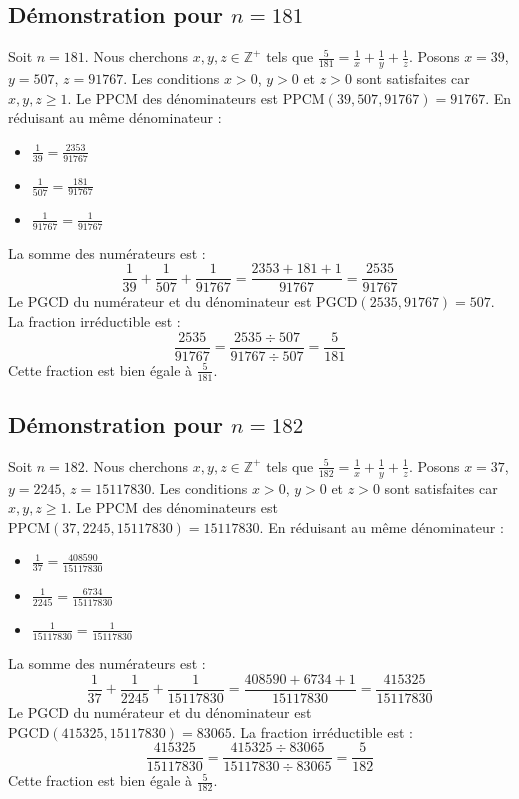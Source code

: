 \documentclass[11pt,a4paper]{article}
\begin{document}
\subsection{Démonstration pour $n = 181$}
Soit $n = 181$. Nous cherchons $x, y, z \in \mathbb{Z}^{+}$ tels que $\frac{5}{181} = \frac{1}{x} + \frac{1}{y} + \frac{1}{z}$.
Posons $x = 39$, $y = 507$, $z = 91767$.
Les conditions $x > 0$, $y > 0$ et $z > 0$ sont satisfaites car $x, y, z \geq 1$.
Le PPCM des dénominateurs est $\text{PPCM}(39, 507, 91767) = 91767$.
En réduisant au même dénominateur :
\begin{itemize}
    \item $\frac{1}{39} = \frac{2353}{91767}$
    \item $\frac{1}{507} = \frac{181}{91767}$
    \item $\frac{1}{91767} = \frac{1}{91767}$
\end{itemize}
La somme des numérateurs est :
$$ \frac{1}{39} + \frac{1}{507} + \frac{1}{91767} = \frac{2353 + 181 + 1}{91767} = \frac{2535}{91767} $$
Le PGCD du numérateur et du dénominateur est $\text{PGCD}(2535, 91767) = 507$.
La fraction irréductible est :
$$ \frac{2535}{91767} = \frac{2535 \div 507}{91767 \div 507} = \frac{5}{181} $$
Cette fraction est bien égale à $\frac{5}{181}$.

\subsection{Démonstration pour $n = 182$}
Soit $n = 182$. Nous cherchons $x, y, z \in \mathbb{Z}^{+}$ tels que $\frac{5}{182} = \frac{1}{x} + \frac{1}{y} + \frac{1}{z}$.
Posons $x = 37$, $y = 2245$, $z = 15117830$.
Les conditions $x > 0$, $y > 0$ et $z > 0$ sont satisfaites car $x, y, z \geq 1$.
Le PPCM des dénominateurs est $\text{PPCM}(37, 2245, 15117830) = 15117830$.
En réduisant au même dénominateur :
\begin{itemize}
    \item $\frac{1}{37} = \frac{408590}{15117830}$
    \item $\frac{1}{2245} = \frac{6734}{15117830}$
    \item $\frac{1}{15117830} = \frac{1}{15117830}$
\end{itemize}
La somme des numérateurs est :
$$ \frac{1}{37} + \frac{1}{2245} + \frac{1}{15117830} = \frac{408590 + 6734 + 1}{15117830} = \frac{415325}{15117830} $$
Le PGCD du numérateur et du dénominateur est $\text{PGCD}(415325, 15117830) = 83065$.
La fraction irréductible est :
$$ \frac{415325}{15117830} = \frac{415325 \div 83065}{15117830 \div 83065} = \frac{5}{182} $$
Cette fraction est bien égale à $\frac{5}{182}$.
\end{document}
